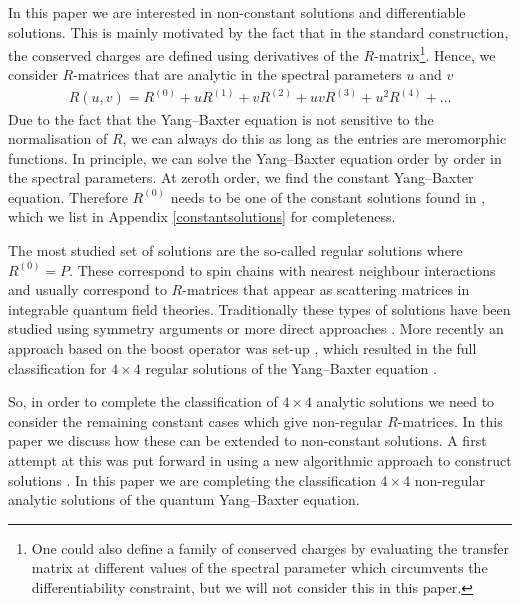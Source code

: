 \documentclass{article}
\begin{document}
In this paper we are interested in non-constant solutions and differentiable solutions. This is mainly motivated by the fact that in the standard construction, the conserved charges are defined using derivatives of the $R$-matrix\footnote{One could also define a family of conserved charges by evaluating the transfer matrix at different values of the spectral parameter which circumvents the differentiability constraint, but we will not consider this in this paper.}. Hence, we consider $R$-matrices that are analytic in the spectral parameters $u$ and $v$
%
\begin{align}
\label{reg-exp}
    R(u,v) = R^{(0)}+u R^{(1)}+v R^{(2)}+ uv R^{(3)}+ u^2 R^{(4)}+\dots
\end{align}
%
Due to the fact that the Yang--Baxter equation is not sensitive to the normalisation of $R$, we can always do this as long as the entries are meromorphic functions. In principle, we can solve the Yang--Baxter equation order by order in the spectral parameters. At zeroth order, we find the constant Yang--Baxter equation. Therefore $R^{(0)}$ needs to be one of the constant solutions found in \cite{HIETARINTA}, which we list in Appendix \ref{constantsolutions} for completeness. 

The most studied set of solutions are the so-called regular solutions where $R^{(0)} = P$. These correspond to spin chains with nearest neighbour interactions and usually correspond to $R$-matrices that appear as scattering matrices in integrable quantum field theories. Traditionally these types of solutions have been studied using symmetry arguments \cite{Drinfeld:1985rx,Jimbo:1985zk} or more direct approaches \cite{Vieira_2018} . More recently an approach based on the boost operator was set-up \cite{de_Leeuw_2019,deLeeuw:2020ahe,de_Leeuw_2021}, which resulted in the full classification for $4\times4$ regular solutions of the Yang--Baxter equation \cite{Corcoran:2023zax}.

So, in order to complete the classification of $4\times4$ analytic solutions  we need to consider the remaining constant cases which give non-regular $R$-matrices. In this paper we discuss how these can be extended to non-constant solutions. A first attempt at this was put forward in  \cite{Garkun:2024jnp} using a new algorithmic approach to construct solutions . In this paper we are completing the classification $4\times4$ non-regular analytic solutions of the quantum Yang--Baxter equation. 
\end{document}
